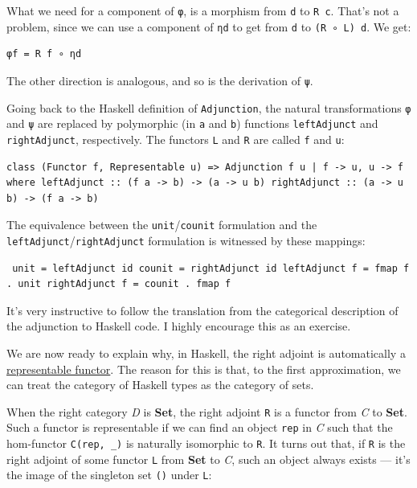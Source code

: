 What we need for a component of \texttt{φ}, is a morphism from
\texttt{d} to \texttt{R\ c}. That's not a problem, since we can use a
component of \texttt{ηd} to get from \texttt{d} to
\texttt{(R\ ∘\ L)\ d}. We get:

\begin{verbatim}
φf = R f ∘ ηd
\end{verbatim}

The other direction is analogous, and so is the derivation of
\texttt{ψ}.

Going back to the Haskell definition of \texttt{Adjunction}, the natural
transformations \texttt{φ} and \texttt{ψ} are replaced by polymorphic
(in \texttt{a} and \texttt{b}) functions \texttt{leftAdjunct} and
\texttt{rightAdjunct}, respectively. The functors \texttt{L} and
\texttt{R} are called \texttt{f} and \texttt{u}:

\begin{verbatim}
class (Functor f, Representable u) => Adjunction f u | f -> u, u -> f where leftAdjunct :: (f a -> b) -> (a -> u b) rightAdjunct :: (a -> u b) -> (f a -> b) 
\end{verbatim}

The equivalence between the \texttt{unit}/\texttt{counit} formulation
and the \texttt{leftAdjunct}/\texttt{rightAdjunct} formulation is
witnessed by these mappings:

\begin{verbatim}
 unit = leftAdjunct id counit = rightAdjunct id leftAdjunct f = fmap f . unit rightAdjunct f = counit . fmap f 
\end{verbatim}

It's very instructive to follow the translation from the categorical
description of the adjunction to Haskell code. I highly encourage this
as an exercise.

We are now ready to explain why, in Haskell, the right adjoint is
automatically a
\href{https://bartoszmilewski.com/2015/07/29/representable-functors/}{representable
functor}. The reason for this is that, to the first approximation, we
can treat the category of Haskell types as the category of sets.

When the right category \emph{D} is \textbf{Set}, the right adjoint
\texttt{R} is a functor from \emph{C} to \textbf{Set}. Such a functor is
representable if we can find an object \texttt{rep} in \emph{C} such
that the hom-functor \texttt{C(rep,\ \_)} is naturally isomorphic to
\texttt{R}. It turns out that, if \texttt{R} is the right adjoint of
some functor \texttt{L} from \textbf{Set} to \emph{C}, such an object
always exists --- it's the image of the singleton set \texttt{()} under
\texttt{L}:

